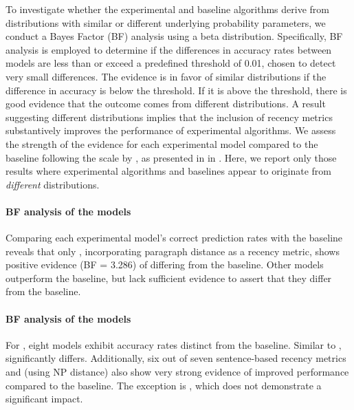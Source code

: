 To investigate whether the experimental and baseline algorithms derive from distributions with similar or different underlying probability parameters, we conduct a Bayes Factor (BF) analysis using a beta distribution. Specifically, BF analysis is employed to determine if the differences in accuracy rates between models are less than or exceed a predefined threshold of 0.01, chosen to detect very small differences. The evidence is in favor of similar distributions if the difference in accuracy is below the threshold. If it is above the threshold, there is good evidence that the outcome comes from different distributions. A result suggesting different distributions implies that the inclusion of recency metrics substantively improves the performance of experimental algorithms. We assess the strength of the evidence for each experimental model compared to the baseline following the scale by \citet{kass1995bayes}, as presented in  in . Here, we report only those results where experimental algorithms and baselines appear to originate from \emph{different} distributions.


\paragraph*{BF analysis of the \msrcor models}

Comparing each experimental model's correct prediction rates with the baseline reveals that only , incorporating paragraph distance as a recency metric, shows positive evidence (BF = 3.286) of differing from the baseline. Other models outperform the baseline, but lack sufficient evidence to assert that they differ from the baseline.

\paragraph*{BF analysis of the \wsj models}

For \wsj, eight models exhibit accuracy rates distinct from the baseline. Similar to \msrcor,  significantly differs. Additionally, six out of seven sentence-based recency metrics and  (using NP distance) also show very strong evidence of improved performance compared to the baseline. The exception is , which does not demonstrate a significant impact.

